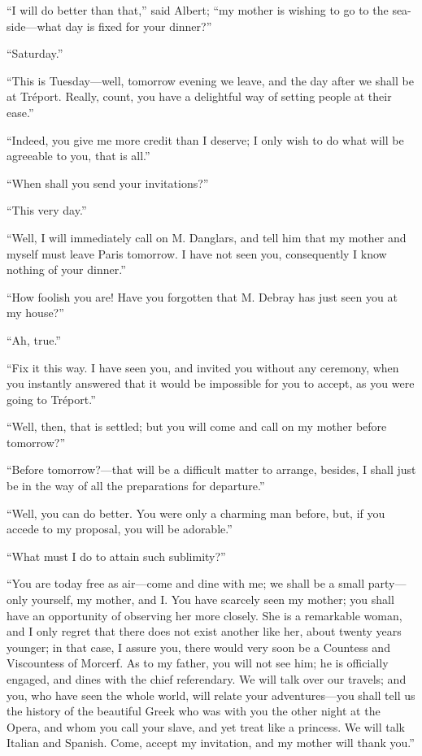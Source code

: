 “I will do better than that,” said Albert; “my mother is wishing to go
to the sea-side—what day is fixed for your dinner?”

“Saturday.”

“This is Tuesday—well, tomorrow evening we leave, and the day after we
shall be at Tréport. Really, count, you have a delightful way of
setting people at their ease.”

“Indeed, you give me more credit than I deserve; I only wish to do what
will be agreeable to you, that is all.”

“When shall you send your invitations?”

“This very day.”

“Well, I will immediately call on M. Danglars, and tell him that my
mother and myself must leave Paris tomorrow. I have not seen you,
consequently I know nothing of your dinner.”

“How foolish you are! Have you forgotten that M. Debray has just seen
you at my house?”

“Ah, true.”

“Fix it this way. I have seen you, and invited you without any
ceremony, when you instantly answered that it would be impossible for
you to accept, as you were going to Tréport.”

“Well, then, that is settled; but you will come and call on my mother
before tomorrow?”

“Before tomorrow?—that will be a difficult matter to arrange, besides,
I shall just be in the way of all the preparations for departure.”

“Well, you can do better. You were only a charming man before, but, if
you accede to my proposal, you will be adorable.”

“What must I do to attain such sublimity?”

“You are today free as air—come and dine with me; we shall be a small
party—only yourself, my mother, and I. You have scarcely seen my
mother; you shall have an opportunity of observing her more closely.
She is a remarkable woman, and I only regret that there does not exist
another like her, about twenty years younger; in that case, I assure
you, there would very soon be a Countess and Viscountess of Morcerf. As
to my father, you will not see him; he is officially engaged, and dines
with the chief referendary. We will talk over our travels; and you, who
have seen the whole world, will relate your adventures—you shall tell
us the history of the beautiful Greek who was with you the other night
at the Opera, and whom you call your slave, and yet treat like a
princess. We will talk Italian and Spanish. Come, accept my invitation,
and my mother will thank you.”

